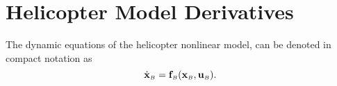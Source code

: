 \chapter{Helicopter Model Derivatives}
\label{app:sample}

The dynamic equations of the helicopter nonlinear model, can be denoted in compact notation as
\begin{equation}
    \dot{\mathbf{x}}_{\scriptscriptstyle B} = \mathbf{f}_{\scriptscriptstyle B}(\mathbf{x}_{\scriptscriptstyle B},\mathbf{u}_{\scriptscriptstyle B}).
\end{equation}
